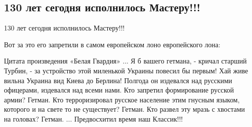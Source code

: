  
 
 
 
 

\subsection{130 лет сегодня исполнилось Мастеру!!!}
\label{sec:15_05_2021.fb.shevcov_anton.1.bulgakov}

130 лет сегодня исполнилось Мастеру!!!

Вот за это его запретили в самом европейском лоно европейского лона:

Цитата произведения «Белая Гвардия»
... Я б вашего гетмана, - кричал старший Турбин, - за устройство этой миленькой Украины повесил бы первым!
Хай живе вильна Украина вид Киева до Берлина! Полгода он издевался над русскими офицерами, издевался над всеми нами.
Кто запретил формирование русской армии? Гетман.
Кто терроризировал русское население этим гнусным языком, которого и на свете то не существует? Гетман.
Кто развел эту мразь с хвостами на головах? Гетман. ...
Предвосхитил время наш Классик!!!
